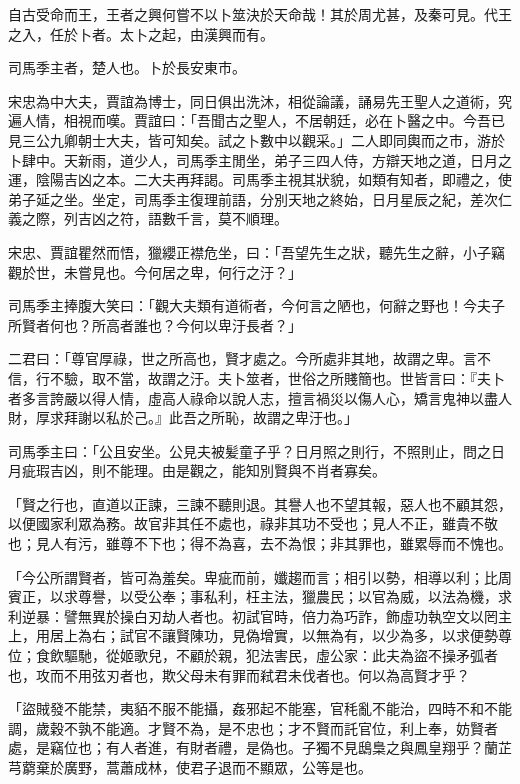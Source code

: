 
\begin{pinyinscope}
自古受命而王，王者之興何嘗不以卜筮決於天命哉！其於周尤甚，及秦可見。代王之入，任於卜者。太卜之起，由漢興而有。

司馬季主者，楚人也。卜於長安東市。

宋忠為中大夫，賈誼為博士，同日俱出洗沐，相從論議，誦易先王聖人之道術，究遍人情，相視而嘆。賈誼曰：「吾聞古之聖人，不居朝廷，必在卜醫之中。今吾已見三公九卿朝士大夫，皆可知矣。試之卜數中以觀采。」二人即同輿而之市，游於卜肆中。天新雨，道少人，司馬季主閒坐，弟子三四人侍，方辯天地之道，日月之運，陰陽吉凶之本。二大夫再拜謁。司馬季主視其狀貌，如類有知者，即禮之，使弟子延之坐。坐定，司馬季主復理前語，分別天地之終始，日月星辰之紀，差次仁義之際，列吉凶之符，語數千言，莫不順理。

宋忠、賈誼瞿然而悟，獵纓正襟危坐，曰：「吾望先生之狀，聽先生之辭，小子竊觀於世，未嘗見也。今何居之卑，何行之汙？」

司馬季主捧腹大笑曰：「觀大夫類有道術者，今何言之陋也，何辭之野也！今夫子所賢者何也？所高者誰也？今何以卑汙長者？」

二君曰：「尊官厚祿，世之所高也，賢才處之。今所處非其地，故謂之卑。言不信，行不驗，取不當，故謂之汙。夫卜筮者，世俗之所賤簡也。世皆言曰：『夫卜者多言誇嚴以得人情，虛高人祿命以說人志，擅言禍災以傷人心，矯言鬼神以盡人財，厚求拜謝以私於己。』此吾之所恥，故謂之卑汙也。」

司馬季主曰：「公且安坐。公見夫被髪童子乎？日月照之則行，不照則止，問之日月疵瑕吉凶，則不能理。由是觀之，能知別賢與不肖者寡矣。

「賢之行也，直道以正諫，三諫不聽則退。其譽人也不望其報，惡人也不顧其怨，以便國家利眾為務。故官非其任不處也，祿非其功不受也；見人不正，雖貴不敬也；見人有污，雖尊不下也；得不為喜，去不為恨；非其罪也，雖累辱而不愧也。

「今公所謂賢者，皆可為羞矣。卑疵而前，孅趨而言；相引以勢，相導以利；比周賓正，以求尊譽，以受公奉；事私利，枉主法，獵農民；以官為威，以法為機，求利逆暴：譬無異於操白刃劫人者也。初試官時，倍力為巧詐，飾虛功執空文以罔主上，用居上為右；試官不讓賢陳功，見偽增實，以無為有，以少為多，以求便勢尊位；食飲驅馳，從姬歌兒，不顧於親，犯法害民，虛公家：此夫為盜不操矛弧者也，攻而不用弦刃者也，欺父母未有罪而弒君未伐者也。何以為高賢才乎？

「盜賊發不能禁，夷貊不服不能攝，姦邪起不能塞，官秏亂不能治，四時不和不能調，歲穀不孰不能適。才賢不為，是不忠也；才不賢而託官位，利上奉，妨賢者處，是竊位也；有人者進，有財者禮，是偽也。子獨不見鴟梟之與鳳皇翔乎？蘭芷芎藭棄於廣野，蒿蕭成林，使君子退而不顯眾，公等是也。


\end{pinyinscope}
